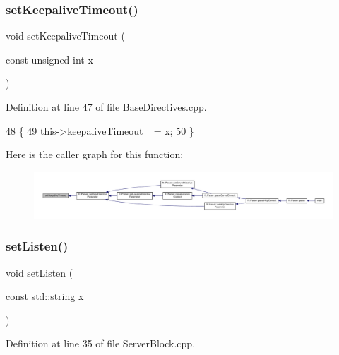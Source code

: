 \subsubsection{\texorpdfstring{set\+Keepalive\+Timeout()}{setKeepaliveTimeout()}}
{\footnotesize\ttfamily void set\+Keepalive\+Timeout (\begin{DoxyParamCaption}\item[{const unsigned int}]{x }\end{DoxyParamCaption})\hspace{0.3cm}{\ttfamily [inherited]}}



Definition at line 47 of file Base\+Directives.\+cpp.


\begin{DoxyCode}
48     \{
49         this->\hyperlink{classft_1_1_base_directives_aa1f5f394b428d0d18765a9b9e14e648f}{keepaliveTimeout\_} = x;
50     \}
\end{DoxyCode}
Here is the caller graph for this function\+:
\nopagebreak
\begin{figure}[H]
\begin{center}
\leavevmode
\includegraphics[width=350pt]{classft_1_1_base_directives_a0818b8529872ba9622329e2118d20c39_icgraph}
\end{center}
\end{figure}
\mbox{\label{classft_1_1_server_block_a0f0253aecea7200c5b8dabdfff638909}} 
\subsubsection{\texorpdfstring{set\+Listen()}{setListen()}}
{\footnotesize\ttfamily void set\+Listen (\begin{DoxyParamCaption}\item[{const std\+::string}]{x }\end{DoxyParamCaption})}



Definition at line 35 of file Server\+Block.\+cpp.


